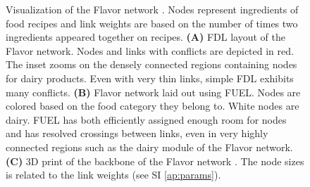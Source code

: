 \documentclass[nofootinbib,preprint,floatfix,titlepage,endfloats,superscriptaddress]{revtex4} %
\begin{document}
\begin{figure}
    \caption{\scriptsize 
    Visualization of the Flavor network \cite{ahn2011flavor}. 
    Nodes represent ingredients of food recipes and link weights are based on the number of times two ingredients appeared together on recipes. 
    {\bf (A)} FDL layout of the Flavor network.  
    Nodes and links with conflicts are depicted in red. 
    The inset zooms on the densely connected regions containing nodes for dairy products. 
    Even with very thin links, simple FDL exhibits many conflicts. 
    {\bf (B)} Flavor network laid out using FUEL. Nodes are colored based on the food category they belong to. 
    White nodes are dairy. 
    FUEL has both efficiently assigned enough room for nodes and has resolved crossings between links, even in very highly connected regions such as the dairy module of the Flavor network.  
    {\bf (C)} 3D print of the backbone of the Flavor network  \cite{ahn2011flavor}. 
    The node sizes is related to the link weights (see SI \ref{ap:params}). 
    }
    \label{fig:3d-print}
    \newpage
\end{figure}
%
\end{document}
